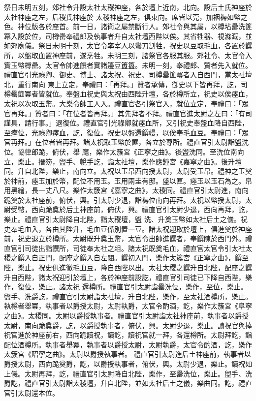 \begin{pinyinscope}
 祭日未明五刻，郊社令升設太社太稷神座，各於壇上近南，北向。設后土氏神座於太社神座之左，后稷氏神座於
 太稷神座之左，俱東向。席皆以莞，加裀褥如幣之色。神位版各於座首。前一日，諸衛之屬禁斷行人。郊社令與其屬，以樽坫罍洗篚冪入設於位，司樽罍奉禮郎及執事者升自太社壇西陛以俟。其省牲器、視滌溉，並如郊廟儀。祭日未明十刻，太官令率宰人以鸞刀割牲，祝史以豆取毛血，各置於饌所，以盤取血置神座前，遂烹牲。未明三刻，諸祭官各服其服。郊社令、太官令入實玉幣樽罍。太官令帥進饌者實諸籩豆簠簋。未明一刻，奉禮郎、贊者先入就位。禮直官引光祿卿、御史、博士、諸太祝、祝史、司樽罍篚冪者入自西門，當太社壇北，重行南向
 東上立定，奉禮曰：「再拜。」贊者承傳，御史以下皆再拜，訖，司樽罍篚冪者皆就位。奉盤血祝史與太祝由西陛升壇，各於樽所立，祝史以俟瘞血，太祝以次取玉幣。大樂令帥工人入。禮直官各引祭官入，就位立定，奉禮曰：「眾官再拜。」贊者曰：「在位者皆再拜。」其先拜者不拜。禮直官進太尉之左曰：「有司謹具，請行事。」退復位。禮直官引光祿卿就瘞血所，又引祝史奉盤血降自西陛，至瘞位，光祿卿瘞血，訖，復位。祝史以盤還饌幔，以俟奉毛血豆。奉禮曰：「眾官再拜。」在位者皆再拜。諸太祝取玉幣於篚，各立於尊所。禮直官引太尉詣盥洗位。協律郎跪，俯伏，舉
 麾，樂作太簇宮《正寧之曲》。後盥洗同。至洗位南向立，樂止。搢笏，盥手、帨手訖，詣太社壇，樂作應鐘宮《嘉寧之曲》。後升壇同。升自北陛，樂止，南向立。太祝以玉帛西向授太尉，太尉受玉帛。禮神之玉奠於神前，瘞玉加於幣，配位不用玉。玉用兩圭有邸。盛以匣。瘞玉以玉石為之。帛用黑繒，長一丈八尺。樂作太簇宮《嘉寧之曲》，太稷同。禮直官引太尉進，南向跪奠於太社座前，俯伏，興。引太尉少退，詣褥位南向再拜。太祝以幣授太尉，太尉受幣，西向跪奠於后土神座前，俯伏，興。禮直官引太尉少退，西向再拜，訖，樂止。禮直官引太尉降自北陛，詣太稷壇，盥
 洗、升奠玉幣如太社后土之儀。祝史奉毛血入，各由其陛升，毛血豆係別置一豆。諸太祝迎取於壇上，俱進奠於神座前，祝史退立於樽所。太尉既升奠玉幣，太官令出帥進饌者，奉饌陳於西門外。禮直官引司徒出詣饌所，司徒奉太社之俎。諸太祝既奠毛血，禮直官太官令引太社太稷之饌入自正門，配座之饌入自左闥。饌初入門，樂作太簇宮《正寧之曲》，饌至陛，樂止。祝史俱進徹毛血豆，降自西陛以出。太社太稷之饌升自北陛，配座之饌升自西陛，諸太祝迎引於壇上，各於神座前設訖，禮直官引司徒已下降自西陛，樂作，復位，樂止。諸太祝
 還樽所。禮直官引太尉詣罍洗位，樂作，至位，樂止。盥手、洗爵訖，禮直官引太尉詣太社壇，升自北陛，樂作，至太社酒樽所，樂止。執樽者舉冪，執事者以爵授太尉，太尉執爵，太官令酌酒，訖，樂作太簇宮《阜寧之曲》。太稷同。太尉以爵授執事者。禮直官引太尉詣太社神座前，執事者以爵授太尉，南向跪奠爵，訖，以爵授執事者，俯伏，興。太尉少退，樂止。讀祝官與捧祝官進於神座前右，西向跪讀祝，讀訖，讀祝官就一拜，各還樽所。太尉拜訖，詣配位酒樽所。執事者舉冪，執事者以爵授太尉，太尉執爵，太官令酌酒，訖，樂作太簇宮《昭寧之曲》。太尉以爵授執事者。
 禮直官引太尉進后土神座前，執事者以爵授太尉，西向跪奠爵，訖，以爵授執事者，俯伏，興。太尉少退，樂止。讀祝如上儀。太尉再拜，訖，禮直官引太尉降自北陛，樂作，至罍洗位，樂止。盥手、洗爵訖，禮直官引太尉詣太稷壇，升自北陛，並如太社后土之儀，樂曲同。訖，禮直官引太尉還本位。




\end{pinyinscope}
